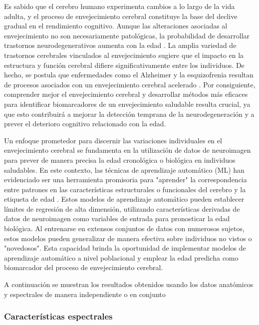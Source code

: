 \documentclass[11pt,letterpaper]{article}
\numberwithin{equation}{subsection}
\numberwithin{table}{subsection}
\begin{document}
\noindent Es sabido que el cerebro humano experimenta cambios a lo largo de la vida adulta, y el proceso de envejecimiento cerebral constituye la base del declive gradual en el rendimiento cognitivo. Aunque las alteraciones asociadas al envejecimiento no son necesariamente patológicas, la probabilidad de desarrollar trastornos neurodegenerativos aumenta con la edad \cite{abbott2011dementia}. La amplia variedad de trastornos cerebrales vinculados al envejecimiento sugiere que el impacto en la estructura y función cerebral difiere significativamente entre los individuos. De hecho, se postula que enfermedades como el Alzheimer y la esquizofrenia resultan de procesos asociados con un envejecimiento cerebral acelerado \cite{kirkpatrick2008schizophrenia, sluimer2009accelerating}. Por consiguiente, comprender mejor el envejecimiento cerebral y desarrollar métodos más eficaces para identificar biomarcadores de un envejecimiento saludable resulta crucial, ya que esto contribuirá a mejorar la detección temprana de la neurodegeneración y a prever el deterioro cognitivo relacionado con la edad.

\bigskip
\noindent Un enfoque prometedor para discernir las variaciones individuales en el envejecimiento cerebral se fundamenta en la utilización de datos de neuroimagen para prever de manera precisa la edad cronológica o biológica en individuos saludables. En este contexto, las técnicas de aprendizaje automático (ML) han evidenciado ser una herramienta promisoria para "aprender" la correspondencia entre patrones en las características estructurales o funcionales del cerebro y la etiqueta de edad \cite{dosenbach2010prediction, franke2010estimating} . Estos modelos de aprendizaje automático pueden establecer límites de regresión de alta dimensión, utilizando características derivadas de datos de neuroimagen como variables de entrada para pronosticar la edad biológica. Al entrenarse en extensos conjuntos de datos con numerosos sujetos, estos modelos pueden generalizar de manera efectiva sobre individuos no vistos o "novedosos". Esta capacidad brinda la oportunidad de implementar modelos de aprendizaje automático a nivel poblacional y emplear la edad predicha como biomarcador del proceso de envejecimiento cerebral.

\bigskip
\noindent A continuación se muestran los resultados obtenidos usando los datos anatómicos y espectrales de manera independiente o en conjunto

\subsubsection{Características espectrales}
\end{document}
